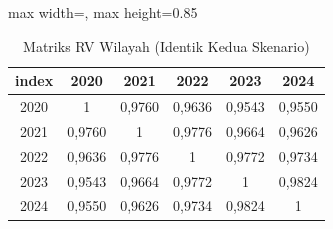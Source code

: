 \begin{table}[H]
\centering
\caption{Matriks RV Wilayah (Identik Kedua Skenario)} \label{tab:apprv_w}
\begin{adjustbox}{max width=\textwidth, max height=0.85\textheight}
\begin{tabular}{|c|c|c|c|c|c|}
\hline
\textbf{index} & \textbf{2020} & \textbf{2021} & \textbf{2022} & \textbf{2023} & \textbf{2024} \\
\hline
2020 & 1 & 0,9760 & 0,9636 & 0,9543 & 0,9550 \\
2021 & 0,9760 & 1 & 0,9776 & 0,9664 & 0,9626 \\
2022 & 0,9636 & 0,9776 & 1 & 0,9772 & 0,9734 \\
2023 & 0,9543 & 0,9664 & 0,9772 & 1 & 0,9824 \\
2024 & 0,9550 & 0,9626 & 0,9734 & 0,9824 & 1 \\
\hline
\end{tabular}
\end{adjustbox}
\end{table}